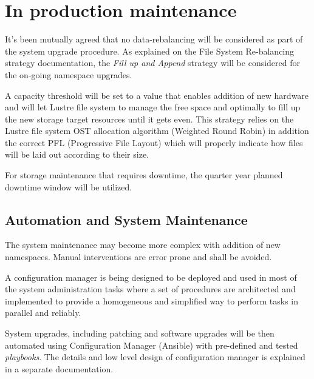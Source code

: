 \documentclass{article}
\begin{document}
\section{In production maintenance}
It's been mutually agreed that no data-rebalancing will be considered as part of the system upgrade procedure. As explained on the File System Re-balancing strategy documentation, the \textit{Fill up and Append} strategy will be considered for the on-going namespace upgrades.

A capacity threshold will be set to a value that enables addition of new hardware and will let Lustre file system to manage the free space and optimally to fill up the new storage target resources until it gets even. This strategy relies on the Lustre file system OST allocation algorithm (Weighted Round Robin) in addition the correct PFL (Progressive File Layout) which will properly indicate how files will be laid out according to their size. 

For storage maintenance that requires downtime, the quarter year planned downtime window will be utilized.

\subsection{Automation and System Maintenance}
The system maintenance may become more complex with addition of new namespaces. Manual interventions are error prone and shall be avoided.

A configuration manager is being designed to be deployed and used in most of the system administration tasks where a set of procedures are architected and implemented to provide a homogeneous and simplified way to perform tasks in parallel and reliably.

System upgrades, including patching and software upgrades will be then automated using Configuration Manager (Ansible) with pre-defined and tested \textit{playbooks}. The details and low level design of configuration manager is explained in a separate documentation.
\end{document}
